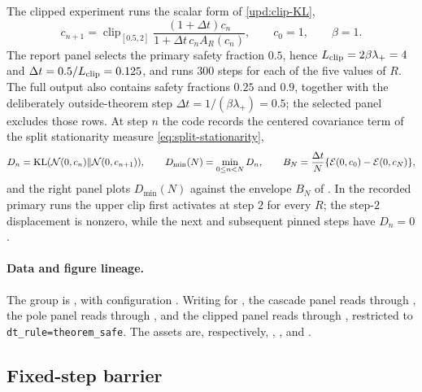 The clipped experiment runs the scalar form of \eqref{upd:clip-KL},
\begin{equation*}
  c_{n+1} = \operatorname{clip}_{[0.5,2]}
  \frac{(1+\Delta t)c_n}{1+\Delta t\,c_nA_R(c_n)},
  \qquad c_0 = 1,\qquad \beta = 1.
\end{equation*}
The report panel selects the primary safety fraction $0.5$, hence
$L_{\rm clip} = 2\beta\lambda_+ = 4$ and
$\Delta t = 0.5/L_{\rm clip} = 0.125$, and runs $300$ steps for each of the five
values of $R$. The full output also contains safety fractions $0.25$ and $0.9$,
together with the deliberately outside-theorem step
$\Delta t = 1/(\beta\lambda_+) = 0.5$; the selected panel excludes those rows.
At step $n$ the code records the centered covariance term of the split
stationarity measure \eqref{eq:split-stationarity},
\begin{equation*}
  D_n = \mathrm{KL}(\mathcal{N}(0,c_n)\|\mathcal{N}(0,c_{n+1})),
  \qquad
  D_{\min}(N) = \min_{0\leq n<N}D_n,
  \qquad
  B_N = \frac{\Delta t}{N}\{\mathcal{E}(0,c_0)-\mathcal{E}(0,c_N)\},
\end{equation*}
and the right panel plots $D_{\min}(N)$ against the envelope $B_N$ of
. In the recorded primary runs the upper clip first activates
at step $2$ for every $R$; the step-$2$ displacement is nonzero, while the next
and subsequent pinned steps have $D_n = 0$.

\paragraph{Data and figure lineage.}
\begingroup\small\raggedright
The group is , with configuration
. Writing  for
, the cascade panel reads
 through
, the pole panel reads
 through , and
the clipped panel reads  through
, restricted to
\texttt{dt\_rule=theorem\_safe}. The assets are, respectively,
,
, and
.
\par\endgroup

\subsection{Fixed-step barrier}


